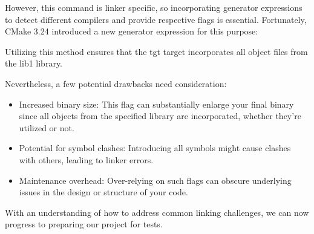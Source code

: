 However, this command is linker specific, so incorporating generator expressions to detect different compilers and provide respective flags is essential. Fortunately, CMake 3.24 introduced a new generator expression for this purpose:


Utilizing this method ensures that the tgt target incorporates all object files from the lib1 library.

Nevertheless, a few potential drawbacks need consideration:

\begin{itemize}
\item
Increased binary size: This flag can substantially enlarge your final binary since all objects from the specified library are incorporated, whether they’re utilized or not.

\item
Potential for symbol clashes: Introducing all symbols might cause clashes with others, leading to linker errors.

\item
Maintenance overhead: Over-relying on such flags can obscure underlying issues in the design or structure of your code.
\end{itemize}

With an understanding of how to address common linking challenges, we can now progress to preparing our project for tests.




